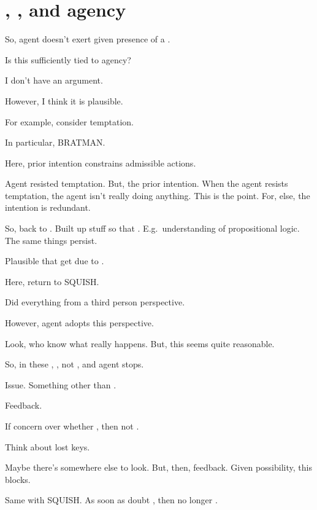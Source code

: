 \section{, , and agency}
\label{sec:ninf2-requ1-agency}

\begin{note}
  \color{red}

  So, agent doesn't exert \ninf{} given presence of a \requ{}.

  Is this sufficiently tied to agency?

  I don't have an argument.

  However, I think it is plausible.

  For example, consider temptation.

  In particular, BRATMAN.

  Here, prior intention constrains admissible actions.

  Agent resisted temptation.
  But, the prior intention.
  When the agent resists temptation, the agent isn't really doing anything.
  This is the point.
  For, else, the intention is redundant.

  So, back to .
  Built up stuff so that .
  E.g.\ understanding of propositional logic.
  The same things persist.
\end{note}

\begin{note}
  Plausible that get \ninf{} due to \requ{}.

  Here, return to SQUISH.

  Did everything from a third person perspective.

  However, agent adopts this perspective.

  Look, who know what really happens.
  But, this seems quite reasonable.
\end{note}

\begin{note}
  So, in these , \requ{}, not \fc{}, and agent stops.
\end{note}

\begin{note}
  Issue.
  Something other than \fc{}.
\end{note}


\begin{note}
  Feedback.

  If concern over whether \fc{}, then not \fc{}.

  Think about lost keys.

  Maybe there's somewhere else to look.
  But, then, feedback.
  Given possibility, this blocks.

  Same with SQUISH.
  As soon as doubt \fc{}, then no longer \fc{}.
\end{note}


